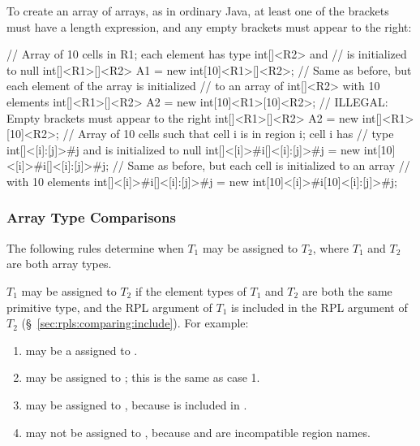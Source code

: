  To create an array of arrays, as in
ordinary Java, at least one of the brackets must have a length
expression, and any empty brackets must appear to the right:
%
\begin{dpjlisting}
// Array of 10 cells in R1; each element has type int[]<R2> and
// is initialized to null
int[]<R1>[]<R2> A1 = new int[10]<R1>[]<R2>;
// Same as before, but each element of the array is initialized
// to an array of int[]<R2> with 10 elements
int[]<R1>[]<R2> A2 = new int[10]<R1>[10]<R2>;
// ILLEGAL:  Empty brackets must appear to the right
int[]<R1>[]<R2> A2 = new int[]<R1>[10]<R2>;
// Array of 10 cells such that cell i is in region i; cell i has
// type int[]<[i]:[j]>#j and is initialized to null
int[]<[i]>#i[]<[i]:[j]>#j = new int[10]<[i]>#i[]<[i]:[j]>#j;
// Same as before, but each cell is initialized to an array
// with 10 elements
int[]<[i]>#i[]<[i]:[j]>#j = new int[10]<[i]>#i[10]<[i]:[j]>#j;
\end{dpjlisting}


\subsubsection{Array Type Comparisons%
\label{sec:types:array:compare}}

The following rules determine when $T_1$ may be assigned to $T_2$,
where $T_1$ and $T_2$ are both array types.

 $T_1$ may be assigned to
$T_2$ if the element types of $T_1$ and $T_2$ are both the same
primitive type, and the RPL argument of $T_1$ is included in the RPL
argument of $T_2$ (\S~\ref{sec:rpls:comparing:include}).  For example:
%
\begin{enumerate}
\item {} may be a assigned to .
\item {} may be assigned to ; this is the same as
  case 1.
\item {} may be assigned to , because
   is included in .
\item {} may not be assigned to , because
   and  are incompatible region names.
\end{enumerate}

